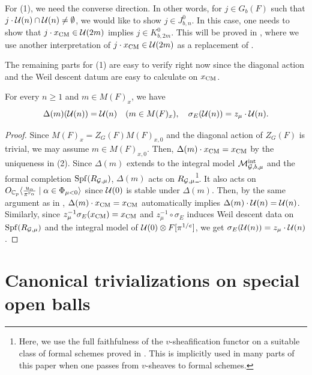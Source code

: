 \documentclass[12pt,reqno]{amsart}
\begin{document}
For  (1), we need the converse direction. In other words, for $j \in G_b(F)$ such that $j \cdot {\mathcal{U}}(n) \cap {\mathcal{U}}(n) \neq \emptyset$, we would like to show $j \in J_{b, n}^0$. In this case, one needs to show that $j \cdot x_{\operatorname{CM}} \in {\mathcal{U}}(2m)$ implies $j \in K_{b, 2m}^0$. This will be proved in , where we use another interpretation of $j \cdot x_{\operatorname{CM}} \in {\mathcal{U}}(2m)$ as a replacement of . 

The remaining parts for  (1) are easy to verify right now since the diagonal action and the Weil descent datum are easy to calculate on $x_{\operatorname{CM}}$. 

\begin{prop} \label{prop:stability_U(n)_diagonal}
    For every $n \geq 1$ and $m \in M(F)_x$, we have 
     \[
        \Delta(m)({\mathcal{U}}(n)) = {\mathcal{U}}(n) \quad (m \in M(F)_x) ,\quad
        \sigma_E({\mathcal{U}}(n)) = z_\mu \cdot {\mathcal{U}}(n). 
    \]
\end{prop}
\begin{proof}
    Since $M(F)_x = Z_G(F) M(F)_{x, 0}$ and the diagonal action of $Z_G(F)$ is trivial, we may assume $m \in M(F)_{x, 0}$. Then, $\Delta(m)\cdot x_{\operatorname{CM}} = x_{\operatorname{CM}}$ by the uniqueness in  (2). Since $\Delta(m)$ extends to the integral model ${\mathcal{M}}^{\operatorname{int}}_{{\mathcal{G}}, b, \mu}$ and the formal completion ${\operatorname{Spf}}(R_{{\mathcal{G}}, \mu})$, $\Delta(m)$ acts on $R_{{\mathcal{G}}, \mu}$\footnote{Here, we use the full faithfulness of the $v$-sheafification functor on a suitable class of formal schemes proved in \cite[Proposition 18.4.1]{SW20}. This is implicitly used in many parts of this paper when one passes from $v$-sheaves to formal schemes.}. It also acts on $O_{\mathbb{C}_p} \langle \tfrac{u_\alpha}{\pi^{r_\alpha}} \mid \alpha \in \Phi_{\mu < 0} \rangle$ since ${\mathcal{U}}(0)$ is stable under $\Delta(m)$. Then, by the same argument as in , $\Delta(m)\cdot x_{\operatorname{CM}} = x_{\operatorname{CM}}$ automatically implies $\Delta(m)\cdot {\mathcal{U}}(n) = {\mathcal{U}}(n)$. Similarly, since $z_\mu^{-1} \sigma_E(x_{\operatorname{CM}}) = x_{\operatorname{CM}}$ and $z_\mu^{-1} \circ \sigma_E$ induces Weil descent data on ${\operatorname{Spf}}(R_{{\mathcal{G}}, \mu})$ and the integral model of ${\mathcal{U}}(0) \otimes F[\pi^{1/e}]$, we get $\sigma_E({\mathcal{U}}(n)) = z_\mu \cdot {\mathcal{U}}(n)$. 
\end{proof}

\section{Canonical trivializations on special open balls} \label{sec:canonical_trivialization}
\end{document}

